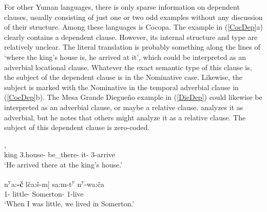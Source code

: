 For other Yuman languages, there is only sparse information on dependent clauses, usually consisting of just one or two odd examples without any discussion of their structure. 
Among these languages is Cocopa.
The example in (\ref{CocDep}a) clearly contains a dependent clause. 
However, its internal structure and type are relatively unclear.
The literal translation is probably something along the lines of `where the king's house is, he arrived at it', which could be interpreted as an adverbial locational clause. 
Whatever the exact semantic type of this clause is, the subject of the dependent clause is in the Nominative  case. 
Likewise, the subject is marked with the Nominative  in the temporal adverbial clause in (\ref{CocDep}b).
The Mesa Grande Diegue\~no example in (\ref{DieDep}) could likewise be interpreted as an adverbial clause, or maybe a relative clause.
\citet[135]{Gorbet:1976} analyzes it as adverbial, but he notes that others might analyze it as a relative clause.
The subject of this dependent clause is zero-coded.

\begin{exe}\ex\label{CocDep}
\begin{xlist} 
\ex\gll  {\rm[}  \textipa{\textsubdot say\'a-m}{\rm]},  \\
         \hspaceThis{[}king 3\sg{}.house-\nom{} be\_there-\dsbj{} it-\loc{} 3-arrive\\
\glt `He arrived there at the king's house.' %

\ex\gll  {\rm[}\textglotstop n\textsuperscript{y}a:\textbf{-\v c} l\v ca:\v s-m{\rm]} sa:m-t\textsuperscript{y} n\textsuperscript{y}-\textschwa wa:\v ca\\
  \hspaceThis{[}1\sg{}-\nom{} little-\dsbj{} Somerton-\loc{} 1-live\\
\glt `When I was little, we lived in Somerton.'
\end{xlist}
\end{exe} %

